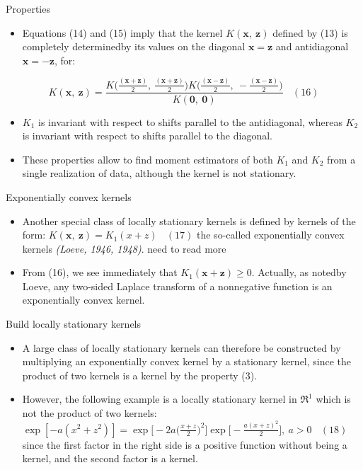 \documentclass[
  ignorenonframetext,
]{beamer}
\providecommand{\tightlist}{%
  \setlength{\itemsep}{0pt}\setlength{\parskip}{0pt}}
\begin{document}
\begin{frame}{Properties}
\protect\hypertarget{properties}{}
\begin{itemize}
\tightlist
\item
  Equations (14) and (15) imply that the kernel \(K(\pmb x,\ \pmb z)\)
  defined by (13) is completely determinedby its values on the diagonal
  \(\pmb x = \pmb z\) and antidiagonal \(\pmb x = - \pmb z\), for:
\end{itemize}

\[
K(\pmb x,\ \pmb z) = \frac {K \big({\frac {(\pmb {x + z})} 2},\ {\frac {(\pmb {x + z})} 2}\big)K \big({\frac {(\pmb {x - z})} 2},\ -{\frac {(\pmb {x - z})} 2}\big)} {K(\pmb 0,\ \pmb 0)} \ \ \ \ (16)
\]

\begin{itemize}
\item
  \(K_1\) is invariant with respect to shifts parallel to the
  antidiagonal, whereas \(K_2\) is invariant with respect to shifts
  parallel to the diagonal.
\item
  These properties allow to find moment estimators of both \(K_1\) and
  \(K_2\) from a single realization of data, although the kernel is not
  stationary.
\end{itemize}
\end{frame}

\begin{frame}{Exponentially convex kernels}
\protect\hypertarget{exponentially-convex-kernels}{}
\begin{itemize}
\item
  Another special class of locally stationary kernels is defined by
  kernels of the form: \(K(\pmb x,\ \pmb z) = K_1(x + z) \ \ \ \ (17)\)
  the so-called exponentially convex kernels \emph{(Loeve, 1946, 1948)}.
  \alert{need to read more}
\item
  From (16), we see immediately that \(K_1(\pmb x + \pmb z) \geq 0\).
  Actually, as notedby Loeve, any two-sided Laplace transform of a
  nonnegative function is an exponentially convex kernel.
\end{itemize}
\end{frame}

\begin{frame}{Build locally stationary kernels}
\protect\hypertarget{build-locally-stationary-kernels}{}
\begin{itemize}
\item
  A large class of locally stationary kernels can therefore be
  constructed by multiplying an exponentially convex kernel by a
  stationary kernel, since the product of two kernels is a kernel by the
  property (3).
\item
  However, the following example is a locally stationary kernel in
  \(\mathfrak R^1\) which is not the product of two kernels:
  \(\exp[-a(x^2+z^2)]=\exp \Big[-2a\big(\frac {x+z} 2\big)^2\Big] \exp\Big[-\frac {a(x+z)^2} 2\Big],\ a>0 \ \ \ \ (18)\)
  since the first factor in the right side is a positive function
  without being a kernel, and the second factor is a kernel.
\end{itemize}
\end{frame}
\end{document}
